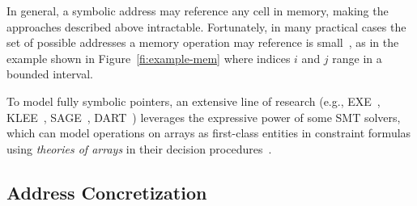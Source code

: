 \begin{itemize}

\end{itemize}

\noindent In general, a symbolic address may reference any cell in memory, making the approaches described above intractable. Fortunately, in many practical cases the set of possible addresses a memory operation may reference is small~\cite{BITBLAZE-ICISS08}, as in the example shown in Figure~\ref{fi:example-mem} where indices $i$ and $j$ range in a bounded interval. 



To model fully symbolic pointers, an extensive line of research  (e.g., {\sc EXE}~\cite{EXE-CCS06}, {\sc KLEE}~\cite{KLEE-OSDI08}, {\sc SAGE}~\cite{SAGE-NDSS08}, {\sc DART}~\cite{DART-PLDI05}) leverages the expressive power of some SMT solvers, which can model operations on arrays as first-class entities in constraint formulas using {\em theories of arrays} in their decision procedures~\cite{STP-CAV07}. 

\subsection{Address Concretization}
\label{ss:address-concretization}

